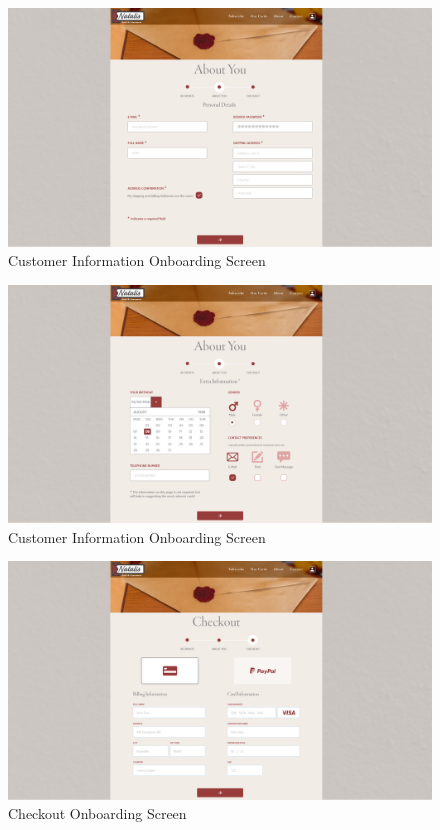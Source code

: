 \documentclass[10pt,a4paper]{article}
\begin{document}
\begin{appendices}
  \begin{figure}[!htb]
\includegraphics[width=1.0\linewidth]{about_you_1.png}
    \caption{Customer Information Onboarding Screen}
  \end{figure}

   \begin{figure}[!htb]
\includegraphics[width=1.0\linewidth]{about_you_2.png}
    \caption{Customer Information Onboarding Screen}
  \end{figure}

  \begin{figure}[!htb]
\includegraphics[width=1.0\linewidth]{checkout.png}
    \caption{Checkout Onboarding Screen}
  \end{figure}




\end{appendices}
\end{document}
